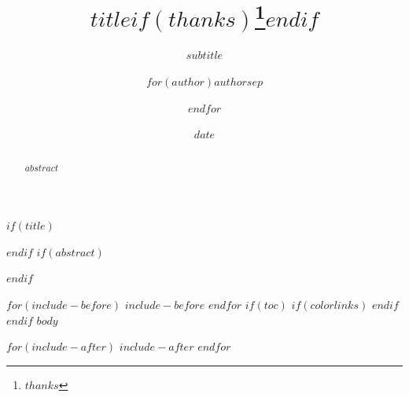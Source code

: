 \documentclass[$if(fontsize)$$fontsize$,$endif$$if(lang)$$lang$,$endif$$if(papersize)$$papersize$paper,$endif$$for(classoption)$$classoption$$sep$,$endfor$]{$documentclass$}
\title{$title$$if(thanks)$\thanks{$thanks$}$endif$}
\subtitle{$subtitle$}
\author{$for(author)$$author$$sep$ \and $endfor$}
\institute{$for(institute)$$institute$$sep$ \and $endfor$}
\date{$date$}
\begin{document}
$if(title)$
\maketitle
$endif$
$if(abstract)$
\begin{abstract}
$abstract$
\end{abstract}
$endif$

$for(include-before)$
$include-before$
$endfor$
$if(toc)$
{
$if(colorlinks)$
\hypersetup{linkcolor=$if(toccolor)$$toccolor$$else$black$endif$}
$endif$
\setcounter{tocdepth}{$toc-depth$}
\tableofcontents
}
$endif$
$body$

$for(include-after)$
$include-after$
$endfor$
\end{document}
